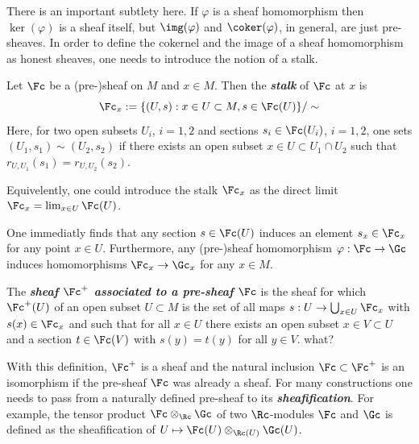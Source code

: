 There is an important subtlety here. If $\varphi$ is a sheaf homomorphism then $\ker(\varphi)$ is a sheaf itself, but $\img(\varphi)$ and $\coker(\varphi)$, in general, are just pre-sheaves. In order to define the cokernel and the image of a sheaf homomorphism as honest sheaves, one needs to introduce the notion of a stalk.
\begin{defn}
	Let $\Fc$ be a (pre-)sheaf on $M$ and $x\in M$. Then the \textbf{\textit{stalk}} of $\Fc$ at $x$ is
	\[\Fc_x:=\{(U,s):x\in U\subset M,s\in\Fc(U)\}/\sim\]
	Here, for two open subsets $U_i$, $i=1,2$ and sections $s_i\in\Fc(U_i)$, $i=1,2$, one sets $(U_1,s_1)\sim(U_2,s_2)$ if there exists an open subset $x\in U\subset U_1\cap U_2$ such that $r_{U,U_1}(s_1)=r_{U,U_2}(s_2)$.
	
	Equivelently, one could introduce the stalk $\Fc_x$ as the direct limit $\Fc_x=\lim_{x\in U}\Fc(U)$.
\end{defn}
\begin{remark}
	One immediatly finds that any section $s\in\Fc(U)$ induces an element $s_x\in\Fc_x$ for any point $x\in U$. Furthermore, any (pre-)sheaf homomorphism $\varphi:\Fc\to\Gc$ induces homomorphisms $\Fc_x\to\Gc_x$ for any $x\in M$.
\end{remark}
\begin{defn}
	The \textbf{\textit{sheaf $\Fc^+$ associated to a pre-sheaf $\Fc$}} is the sheaf for which $\Fc^+(U)$ of an open subset $U\subset M$ is the set of all maps $s:U\to\bigcup_{x\in U}\Fc_x$ with $s(x)\in\Fc_x$ and such that for all $x\in U$ there exists an open subset $x\in V\subset U$ and a section $t\in\Fc(V)$ with $s(y)=t(y)$ for all $y\in V$. {\color{magenta}what?}
\end{defn}
\begin{remark}
	With this definition, $\Fc^+$ is a sheaf and the natural inclusion $\Fc\subset\Fc^+$ is an isomorphism if the pre-sheaf $\Fc$ was already a sheaf. For many constructions one needs to pass from a naturally defined pre-sheaf to its \textbf{\textit{sheafification}}. For example, the tensor product $\Fc\otimes_{\Rc}\Gc$ of two $\Rc$-modules $\Fc$ and $\Gc$ is defined as the sheafification of $U\mapsto\Fc(U)\otimes_{\Rc(U)}\Gc(U)$.
\end{remark}

